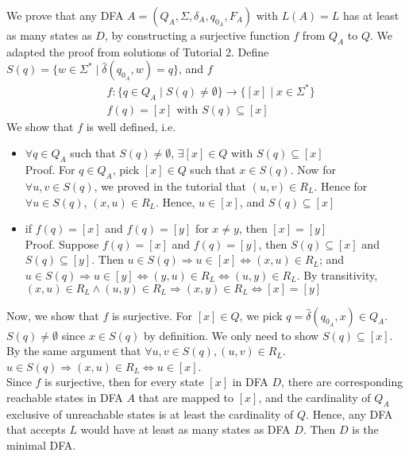 \documentclass[12pt]{article}
\begin{document}
We prove that any DFA \(A = (Q_{A}, \Sigma, \delta_{A}, q_{0_{A}}, F_{A})\) with \(L(A) = L\) has at least as many states as \(D\), by constructing a surjective function \(f\) from \(Q_{A}\) to \(Q\). We adapted the proof from solutions of Tutorial 2. Define \(S(q) = \{w \in \Sigma^{*} \mid \hat{\delta}(q_{0_{A}}, w) = q\}\), and \(f\) 
\begin{align*}
  &f : \{q \in Q_{A} \mid S(q) \neq \emptyset\} \to \{[x] \mid x \in \Sigma^{*}\} \\
  &f(q) = [x] \text{ with } S(q) \subseteq [x]
\end{align*}
We show that \(f\) is well defined, i.e.
\begin{itemize}
  \item \(\forall q \in Q_{A}\) such that \(S(q) \neq \emptyset\), \(\exists [x] \in Q\) with \(S(q) \subseteq [x]\)\\
  Proof. For \(q \in Q_{A}\), pick \([x] \in Q\) such that \(x \in S(q)\). Now for \(\forall u, v \in S(q)\), we proved in the tutorial that \((u, v) \in R_{L}\). Hence for \(\forall u \in S(q)\), \((x, u) \in R_{L}\). Hence, \(u \in [x]\), and \(S(q) \subseteq [x]\)
  \item if \(f(q) = [x]\) and \(f(q) = [y]\) for \(x \neq y\), then \([x] = [y]\)\\
  Proof. Suppose \(f(q) = [x]\) and \(f(q) = [y]\), then \(S(q) \subseteq [x]\) and \(S(q) \subseteq [y]\). Then \(u \in S(q) \Rightarrow u \in [x] \Leftrightarrow (x, u) \in R_{L}\); and \(u \in S(q) \Rightarrow u \in [y] \Leftrightarrow (y, u) \in R_{L} \Leftrightarrow (u, y) \in R_{L}\). By transitivity, \((x, u) \in R_{L} \land (u, y) \in R_{L} \Rightarrow (x, y) \in R_{L} \Leftrightarrow [x] = [y]\)
\end{itemize}
Now, we show that \(f\) is surjective. For \([x] \in Q\), we pick \(q = \hat{\delta}(q_{0_{A}}, x) \in Q_{A}\). \(S(q) \neq \emptyset\) since \(x \in S(q)\) by definition. We only need to show \(S(q) \subseteq [x]\). By the same argument that \(\forall u, v \in S(q), (u, v) \in R_{L}\). \(u \in S(q) \Rightarrow (x, u) \in R_{L} \Leftrightarrow u \in [x]\).\\ 
Since \(f\) is surjective, then for every state \([x]\) in DFA \(D\), there are corresponding reachable states in DFA \(A\) that are mapped to \([x]\), and the cardinality of \(Q_{A}\) exclusive of unreachable states is at least the cardinality of \(Q\). Hence, any DFA that accepts \(L\) would have at least as many states as DFA \(D\). Then \(D\) is the minimal DFA.
\end{document}
